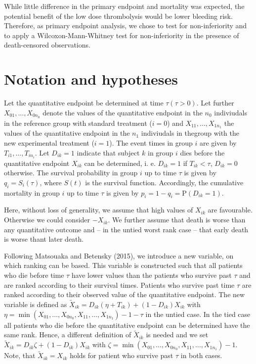 \documentclass[bimj,fleqn]{w-art}\usepackage[]{graphicx}\usepackage[]{color}
\theoremstyle{plain}
\theoremstyle{definition}
\begin{document}
  While little difference in the primary endpoint and mortality was expected,
  the potential benefit of the low dose thrombolysis would be lower bleeding
  risk. Therefore, as primary endpoint analysis, we chose to test for
  non-inferiority and to apply a Wilcoxon-Mann-Whitney test for non-inferiority
  in the presence of death-censored observations.

  \section{Notation and hypotheses}
  \label{sec:Notation}
  Let the quantitative endpoint be determined at time $\tau (\tau > 0)$. Let
  further $X_{01}, \ldots, X_{0n_0}$ denote the values of the quantitative endpoint
  in the $n_0$ indiviudals in the reference group with standard treatment ($i=0$)
  and $X_{11}, \ldots, X_{1n_1}$ the values of the quantitative endpoint in the
  $n_1$ indiviudals in thegroup with the new experimental treatment ($i=1$).
  The event times in group $i$ are given by $T_{i1}, \ldots, T_{in_i}$. Let
  $D_{ik} = 1$ indicate that subject $k$ in group $i$ dies before the
  quantitative endpoint $X_{ik}$ can be determined, i. e. $D_{ik} = 1$ if
  $T_{ik} < \tau $, $D_{ik} = 0$ otherwise. The survival probability in group
  $i$ up to time $\tau$ is given by $q_i = S_i(\tau)$, where $S(t)$ is the survival function.
	Accordingly, the cumulative mortality in group $i$ up to time $\tau$ is given by
  $p_i = 1 - q_i = \text{P}(D_{ik} = 1)$.

  Here, without loss of generality, we assume that high values of $X_{ik}$ are
  favourable. Otherwise we could consider $-X_{ik}$. We further assume that
  death is worse than any quantitative outcome and -- in the untied worst rank
  case -- that early death is worse thant later death.

  Following Matsouaka and Betensky (2015), we introduce a new variable, on which
	ranking can be based. This variable is constructed such that all patients who
	die before time $\tau$ have lower values than the patients who survive past
	$\tau$ and are ranked according to their survival times. Patients who survive
	past time $\tau$ are ranked according to their observed	value of the quantitative
	endpoint. The new variable is defined as
	$\widetilde{X}_{ik} = D_{ik}(\eta  + T_{ik}) + (1 - D_{ik})X_{ik}$ with
	$\eta = \min(X_{01}, \ldots, X_{0n_0}, X_{11}, \ldots, X_{1n_1}) - 1 - \tau$
	in the untied case.  In the tied case all patients who die before the quantitative endpoint
	can be determined have the same rank. Hence, a different definition of $\widetilde{X}_{ik}$
	is needed and we set  $\widetilde{X}_{ik} = D_{ik}\zeta   + (1 - D_{ik})X_{ik}$
	with $\zeta = \min(X_{01}, \ldots, X_{0n_0}, X_{11}, \ldots, X_{1n_1}) - 1$.
	Note, that  $\widetilde{X}_{ik} = {X}_{ik}$ holds for patient who survive past $\tau$ in both cases.
\end{document}
